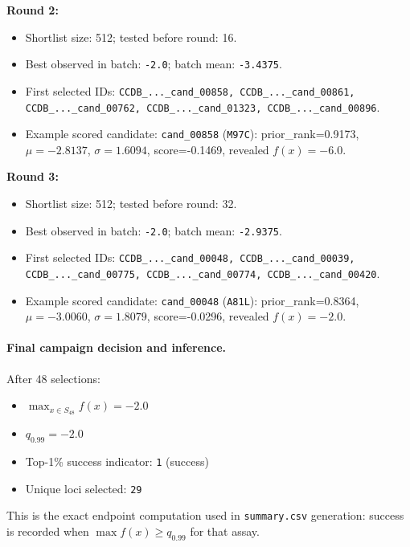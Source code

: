 \documentclass{article}
\begin{document}
\textbf{Round 2:}
\begin{itemize}
\item Shortlist size: 512; tested before round: 16.
\item Best observed in batch: \texttt{-2.0}; batch mean: \texttt{-3.4375}.
\item First selected IDs:
\texttt{CCDB\_...\_cand\_00858, CCDB\_...\_cand\_00861, CCDB\_...\_cand\_00762, CCDB\_...\_cand\_01323, CCDB\_...\_cand\_00896}.
\item Example scored candidate:
\texttt{cand\_00858} (\texttt{M97C}): prior\_rank=0.9173, $\mu=-2.8137$, $\sigma=1.6094$, score=-0.1469, revealed $f(x)=-6.0$.
\end{itemize}

\textbf{Round 3:}
\begin{itemize}
\item Shortlist size: 512; tested before round: 32.
\item Best observed in batch: \texttt{-2.0}; batch mean: \texttt{-2.9375}.
\item First selected IDs:
\texttt{CCDB\_...\_cand\_00048, CCDB\_...\_cand\_00039, CCDB\_...\_cand\_00775, CCDB\_...\_cand\_00774, CCDB\_...\_cand\_00420}.
\item Example scored candidate:
\texttt{cand\_00048} (\texttt{A81L}): prior\_rank=0.8364, $\mu=-3.0060$, $\sigma=1.8079$, score=-0.0296, revealed $f(x)=-2.0$.
\end{itemize}

\paragraph{Final campaign decision and inference.}
After 48 selections:
\begin{itemize}
\item $\max_{x\in S_{48}} f(x)=-2.0$
\item $q_{0.99}=-2.0$
\item Top-1\% success indicator: \texttt{1} (success)
\item Unique loci selected: \texttt{29}
\end{itemize}
This is the exact endpoint computation used in \texttt{summary.csv} generation: success is recorded when $\max f(x)\ge q_{0.99}$ for that assay.
\fi

\clearpage


\end{document}
